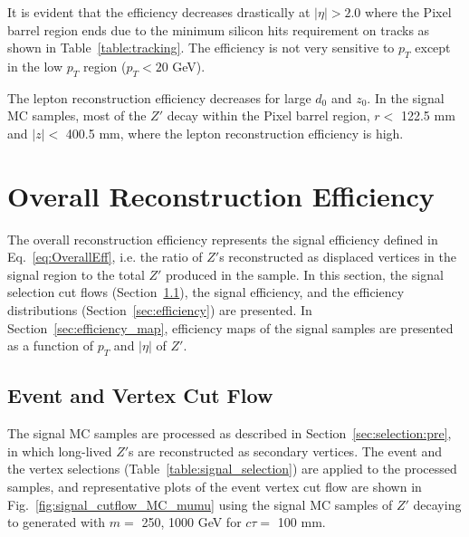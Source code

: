 It is evident that the efficiency decreases drastically at $|\eta| > 2.0$ where the Pixel barrel region ends due to the minimum silicon hits requirement on tracks as shown in Table~\ref{table:tracking}. The efficiency is not very sensitive to $p_{T}$ except in the low $p_{T}$ region ($p_{T} < 20$ GeV).

The lepton reconstruction efficiency decreases for large $d_{0}$ and $z_{0}$. In the signal MC samples, most of the $Z'$ decay within the Pixel barrel region, $r < $ 122.5 mm and $|z| < $ 400.5 mm, where the lepton reconstruction efficiency is high.

\section{Overall Reconstruction Efficiency}
\label{sec:combined_reco_efficiency}
The overall reconstruction efficiency represents the signal efficiency defined in Eq.~\ref{eq:OverallEff}, i.e. the ratio of $Z'$s reconstructed as displaced vertices in the signal region to the total $Z'$ produced in the sample. In this section, the signal selection cut flows (Section~\ref{sec:signal_cutflow}), the signal efficiency, and the efficiency distributions (Section~\ref{sec:efficiency}) are presented. In Section~\ref{sec:efficiency_map}, efficiency maps of the signal samples are presented as a function of $p_{T}$ and $|\eta|$ of $Z'$.

\subsection{Event and Vertex Cut Flow}
\label{sec:signal_cutflow}
The signal MC samples are processed as described in Section~\ref{sec:selection:pre}, in which long-lived $Z'$s are reconstructed as secondary vertices. The event and the vertex selections (Table~\ref{table:signal_selection}) are applied to the processed samples, and representative plots of the event vertex cut flow are shown in Fig.~\ref{fig:signal_cutflow_MC_mumu} using the signal MC samples of $Z'$ decaying to \mumu generated with $m=$ 250, 1000 GeV for $c\tau=$ 100 mm.

